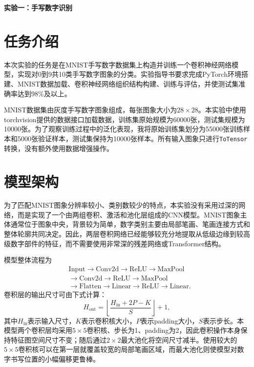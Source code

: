 \documentclass[11pt]{article}
\begin{document}
	\pagestyle{fancy}
	\chead{}
	
	\begin{center}
		{\LARGE \bf 实验一：手写数字识别} 
	\end{center}
	\begin{center}
		\large{}
	\end{center}

	\section{任务介绍}
	本次实验的任务是在MNIST手写数字数据集上构造并训练一个卷积神经网络模型，实现对0到9共10类手写数字图象的分类。实验指导书要求完成PyTorch环境搭建、MNIST数据加载、卷积神经网络组织结构构建、训练与评估，并使测试集准确率达到98\%及以上。

	MNIST数据集由灰度手写数字图象组成，每张图象大小为$28\times 28$。本实验中使用torchvision提供的数据接口加载数据，训练集原始规模为60000张，测试集规模为10000张。为了观察训练过程中的泛化表现，我将原始训练集划分为55000张训练样本和5000张验证样本，测试集保持为10000张样本。所有输入图象只进行\texttt{ToTensor}转换，没有额外使用数据增强操作。

	\section{模型架构}
	为了匹配MNIST图象分辨率较小、类别数较少的特点，本实验没有采用过深的网络，而是实现了一个由两组卷积、激活和池化层组成的CNN模型。MNIST图象主体通常位于图象中央，背景较为简单，数字类别主要由局部笔画、笔画连接方式和整体轮廓共同决定。因此，两层卷积网络已经能够较充分地提取从低级边缘到较高级数字部件的特征，而不需要使用非常深的残差网络或Transformer结构。

	模型整体流程为
	\[
		\begin{aligned}
			&\mathrm{Input}\rightarrow\mathrm{Conv2d}\rightarrow\mathrm{ReLU}\rightarrow\mathrm{MaxPool}\\
			&\rightarrow\mathrm{Conv2d}\rightarrow\mathrm{ReLU}\rightarrow\mathrm{MaxPool}\\
			&\rightarrow\mathrm{Flatten}\rightarrow\mathrm{Linear}\rightarrow\mathrm{ReLU}\rightarrow\mathrm{Linear}.
		\end{aligned}
	\]
	卷积层的输出尺寸可由下式计算：
	\[
		H_{\mathrm{out}}=\left\lfloor\frac{H_{\mathrm{in}}+2P-K}{S}\right\rfloor+1,
	\]
	其中$H_{\mathrm{in}}$表示输入尺寸，$K$表示卷积核大小，$P$表示padding大小，$S$表示步长。本模型两个卷积层均采用$5\times 5$卷积核、步长为1、padding为2，因此卷积操作本身保持特征图空间尺寸不变；随后通过$2\times 2$最大池化将空间尺寸减半。使用较大的$5\times5$卷积核可以在第一层就覆盖较宽的局部笔画区域，而最大池化则使模型对数字书写位置的小幅偏移更鲁棒。
\end{document}
